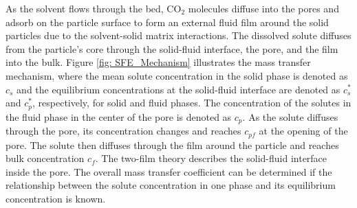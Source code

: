 \documentclass[../Article_Model_Parameters.tex]{subfiles}
\begin{document}
	
	As the solvent flows through the bed, CO$_2$ molecules diffuse into the pores and adsorb on the particle surface to form an external fluid film around the solid particles due to the solvent-solid matrix interactions. The dissolved solute diffuses from the particle's core through the solid-fluid interface, the pore, and the film into the bulk. Figure \ref{fig: SFE_Mechanism} illustrates the mass transfer mechanism, where the mean solute concentration in the solid phase is denoted as $c_s$ and the equilibrium concentrations at the solid-fluid interface are denoted as $c_s^*$ and $c_p^*$, respectively, for solid and fluid phases. The concentration of the solutes in the fluid phase in the center of the pore is denoted as $c_p$. As the solute diffuses through the pore, its concentration changes and reaches $c_{pf}$ at the opening of the pore. The solute then diffuses through the film around the particle and reaches bulk concentration $c_f$. The two-film theory describes the solid-fluid interface inside the pore. The overall mass transfer coefficient can be determined if the relationship between the solute concentration in one phase and its equilibrium concentration is known.
			
\end{document}
